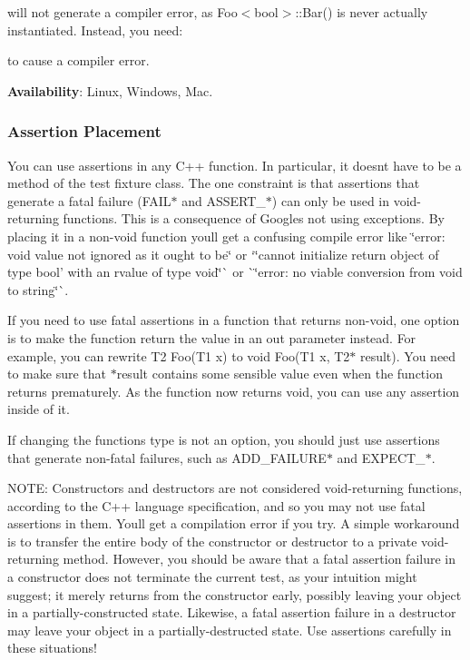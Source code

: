 will not generate a compiler error, as {\ttfamily Foo$<$bool$>$\+::\+Bar()} is never actually instantiated. Instead, you need\+:


\begin{DoxyCode}{0}
\end{DoxyCode}


to cause a compiler error.

{\bfseries{Availability}}\+: Linux, Windows, Mac.

\subsubsection*{Assertion Placement}

You can use assertions in any C++ function. In particular, it doesn\textquotesingle{}t have to be a method of the test fixture class. The one constraint is that assertions that generate a fatal failure ({\ttfamily F\+A\+I\+L$\ast$} and {\ttfamily A\+S\+S\+E\+R\+T\+\_\+$\ast$}) can only be used in void-\/returning functions. This is a consequence of Google\textquotesingle{}s not using exceptions. By placing it in a non-\/void function you\textquotesingle{}ll get a confusing compile error like {\ttfamily \char`\"{}error\+: void value not ignored as it ought to be\char`\"{}} or `\char`\"{}cannot
initialize return object of type \textquotesingle{}bool' with an rvalue of type \textquotesingle{}void\textquotesingle{}\char`\"{}\`{} or \`{}\char`\"{}error\+: no viable conversion from \textquotesingle{}void\textquotesingle{} to \textquotesingle{}string\textquotesingle{}\char`\"{}\`{}.

If you need to use fatal assertions in a function that returns non-\/void, one option is to make the function return the value in an out parameter instead. For example, you can rewrite {\ttfamily T2 Foo(\+T1 x)} to {\ttfamily void Foo(\+T1 x, T2$\ast$ result)}. You need to make sure that {\ttfamily $\ast$result} contains some sensible value even when the function returns prematurely. As the function now returns {\ttfamily void}, you can use any assertion inside of it.

If changing the function\textquotesingle{}s type is not an option, you should just use assertions that generate non-\/fatal failures, such as {\ttfamily A\+D\+D\+\_\+\+F\+A\+I\+L\+U\+R\+E$\ast$} and {\ttfamily E\+X\+P\+E\+C\+T\+\_\+$\ast$}.

N\+O\+TE\+: Constructors and destructors are not considered void-\/returning functions, according to the C++ language specification, and so you may not use fatal assertions in them. You\textquotesingle{}ll get a compilation error if you try. A simple workaround is to transfer the entire body of the constructor or destructor to a private void-\/returning method. However, you should be aware that a fatal assertion failure in a constructor does not terminate the current test, as your intuition might suggest; it merely returns from the constructor early, possibly leaving your object in a partially-\/constructed state. Likewise, a fatal assertion failure in a destructor may leave your object in a partially-\/destructed state. Use assertions carefully in these situations!

